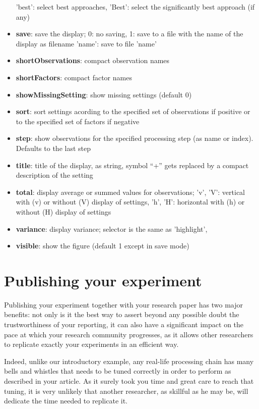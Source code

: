\documentclass[a4paper,fleqn]{tufte-handout}
\begin{document}
\begin{itemize}
        'best': select best approaches,
        'Best': select the significantly best approach (if any)                 
\item \textbf{save}: save the display;
    	0: no saving,
    	1: save to a file with the name of the display as filename
    	'name': save to file 'name'
\item \textbf{shortObservations}: compact observation names                 
\item \textbf{shortFactors}: compact factor names  
\item \textbf{showMissingSetting}:  show missing settings (default 0)                
\item \textbf{sort}:   sort settings acording to the specified set of observations if
        positive or to the specified set of factors if negative
\item \textbf{step}: show observations for the specified processing step (as name or
    index). Defaults to the last step
\item \textbf{title}: title of the display, as string,
    	symbol ``+'' gets replaced by a compact description of the setting  
\item \textbf{total}:  display average  or summed values for observations;
        'v', 'V': vertical with (v) or without (V) display of settings,
        'h', 'H': horizontal with (h) or without (H) display of settings                
\item \textbf{variance}:   display variance;
    	selector is the same as 'highlight',
\item \textbf{visible}: show the figure (default 1 except in save mode)                    
\end{itemize}

\section{Publishing your experiment}

Publishing your experiment together with your research paper has two major benefits: not only is it the best way to assert beyond any possible doubt the trustworthiness of your reporting, it can also have a significant impact on the pace at which your research community progresses, as it allows other researchers to replicate exactly your experiments in an efficient way.

Indeed, unlike our introductory example, any real-life processing chain has many bells and whistles that needs to be tuned correctly in order to perform as described in your article. As it surely took you time and great care to reach that tuning, it is very unlikely that another researcher, as skillful as he may be, will dedicate the time needed to replicate it.
\end{document}
